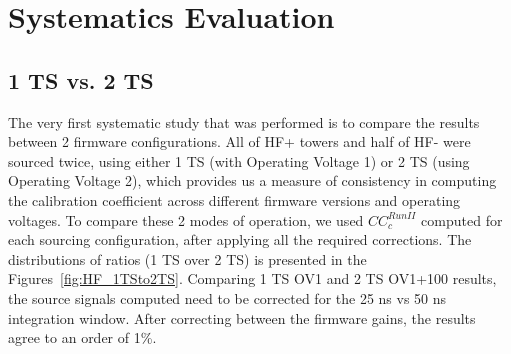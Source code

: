 \section{Systematics Evaluation}
\subsection{1 TS vs. 2 TS}
The very first systematic study that was performed is to compare the results between 2
firmware configurations. All of HF+ towers and half of HF- were sourced twice,
using either 1 TS (with Operating Voltage 1) or 2 TS (using Operating Voltage 2),
which provides us a measure of consistency in computing the calibration
coefficient across different firmware versions and operating voltages.
To compare these 2 modes of operation, we used ${CC}^{Run II}_{c}$ computed for
each sourcing configuration, after applying all the required corrections. The
distributions of ratios (1 TS over 2 TS) is presented in the Figures~\ref{fig:HF_1TSto2TS}. Comparing 1 TS OV1 and 2 TS OV1+100 results, the source signals computed need to be corrected for the 25 ns vs 50 ns integration window. After correcting between the firmware gains, the results agree to an order of 1\%.

